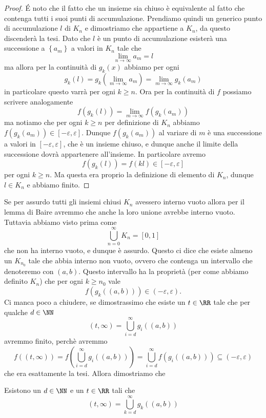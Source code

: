 \documentclass[11pt]{scrartcl}
\begin{document}
  	\begin{proof}
  		\'E noto che il fatto che un insieme sia chiuso è equivalente al fatto che contenga tutti i suoi punti di accumulazione. Prendiamo quindi un generico punto di accumulazione $l$ di $K_n$ e dimostriamo che appartiene a $K_n$, da questo discenderà la tesi. Dato che $l$ è un punto di accumulazione esisterà una successione a $\left\{a_m\right\}$ a valori in $K_n$ tale che 
  		$$\lim_{n\to\infty}a_m=l$$
  		ma allora per la continuità di $g_k(x)$ abbiamo per ogni 
  		$$g_k(l)=g_k\left(\lim_{m\to\infty}a_m\right)=\lim_{m\to\infty}g_k(a_m)$$
  		in particolare questo varrà per ogni $k\ge n$. Ora per la continuità di $f$ possiamo scrivere analogamente
  		$$f(g_k(l))=\lim_{m\to\infty}f(g_k(a_m))$$
  		ma notiamo che per ogni $k\ge n$ per definizione di $K_n$ abbiamo $f(g_k(a_m))\in [-\varepsilon,\varepsilon]$. Dunque $f(g_k(a_m))$ al variare di $m$ è una successione a valori in $[-\varepsilon,\varepsilon]$, che è un insieme chiuso, e dunque anche il limite della successione dovrà appartenere all'insieme. In particolare avremo
  		$$f(g_k(l))=f(kl)\in [-\varepsilon,\varepsilon]$$
  		per ogni $k\ge n$. Ma questa era proprio la definizione di elemento di $K_n$, dunque $l\in K_n$ e abbiamo finito.
  	\end{proof}
  	Se per assurdo tutti gli insiemi chiusi $K_n$ avessero interno vuoto allora per il lemma di Baire avremmo che anche la loro unione avrebbe interno vuoto. Tuttavia abbiamo visto prima come 
  	$$\bigcup_{n=0}^\infty K_n=[0,1]$$
  	che non ha interno vuoto, e dunque è assurdo. Questo ci dice che esiste almeno un $K_{n_0}$ tale che abbia interno non vuoto, ovvero che contenga un intervallo che denoteremo con $(a,b)$. Questo intervallo ha la proprietà (per come abbiamo definito $K_n$) che per ogni $k\ge n_0$ vale
  	$$f(g_k((a,b)))\in (-\varepsilon,\varepsilon).$$
  	Ci manca poco a chiudere, se dimostrassimo che esiste un $t\in\RR$ tale che per qualche $d\in \NN$ 
  	$$(t,\infty)=\bigcup_{i=d}^\infty g_i((a,b))$$	
  	avremmo finito, perchè avremmo
  	$$f((t,\infty))=f\left(\bigcup_{i=d}^\infty g_i((a,b))\right)=\bigcup_{i=d}^\infty f(g_i((a,b)))\subseteq (-\varepsilon,\varepsilon)$$
  	che era esattamente la tesi. Allora dimostriamo che
  	\begin{claim}
  		Esistono un $d\in\NN$ e un $t\in\RR$ tali che 
  		$$(t,\infty)=\bigcup_{k=d}^\infty g_k((a,b))$$
  	\end{claim}
\end{document}
